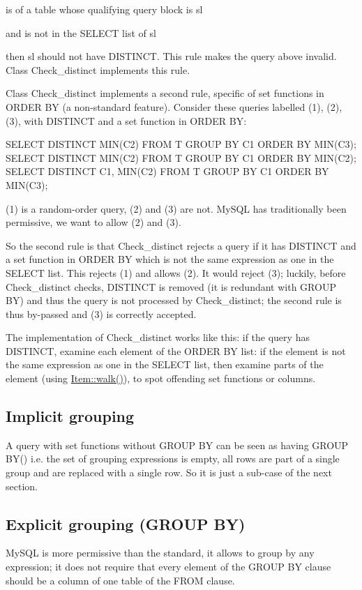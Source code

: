 \begin{DoxyItemize}
\item is of a table whose qualifying query block is \textquotesingle{}sl\textquotesingle{}
\item and is not in the S\+E\+L\+E\+CT list of \textquotesingle{}sl\textquotesingle{}
\end{DoxyItemize}

then \textquotesingle{}sl\textquotesingle{} should not have D\+I\+S\+T\+I\+N\+CT. This rule makes the query above invalid. Class Check\+\_\+distinct implements this rule.

Class Check\+\_\+distinct implements a second rule, specific of set functions in O\+R\+D\+ER BY (a non-\/standard feature). Consider these queries labelled (1), (2), (3), with D\+I\+S\+T\+I\+N\+CT and a set function in O\+R\+D\+ER BY\+: \begin{DoxyVerb}SELECT DISTINCT MIN(C2) FROM T GROUP BY C1 ORDER BY MIN(C3);
SELECT DISTINCT MIN(C2) FROM T GROUP BY C1 ORDER BY MIN(C2);
SELECT DISTINCT C1, MIN(C2) FROM T GROUP BY C1 ORDER BY MIN(C3);
\end{DoxyVerb}
 (1) is a random-\/order query, (2) and (3) are not. My\+S\+QL has traditionally been permissive, we want to allow (2) and (3).

So the second rule is that Check\+\_\+distinct rejects a query if it has D\+I\+S\+T\+I\+N\+CT and a set function in O\+R\+D\+ER BY which is not the same expression as one in the S\+E\+L\+E\+CT list. This rejects (1) and allows (2). It would reject (3); luckily, before Check\+\_\+distinct checks, D\+I\+S\+T\+I\+N\+CT is removed (it is redundant with G\+R\+O\+UP BY) and thus the query is not processed by Check\+\_\+distinct; the second rule is thus by-\/passed and (3) is correctly accepted.

The implementation of Check\+\_\+distinct works like this\+: if the query has D\+I\+S\+T\+I\+N\+CT, examine each element of the O\+R\+D\+ER BY list\+: if the element is not the same expression as one in the S\+E\+L\+E\+CT list, then examine parts of the element (using \mbox{\hyperlink{classItem_ab7d2529511c14a77e59a1b1bbabc95d7}{Item\+::walk()}}), to spot offending set functions or columns.\hypertarget{group__AGGREGATE__CHECKS_IMPLICIT_GROUPING}{}\subsection{Implicit grouping}\label{group__AGGREGATE__CHECKS_IMPLICIT_GROUPING}
A query with set functions without G\+R\+O\+UP BY can be seen as having G\+R\+O\+UP B\+Y() i.\+e. the set of grouping expressions is empty, all rows are part of a single group and are replaced with a single row. So it is just a sub-\/case of the next section.\hypertarget{group__AGGREGATE__CHECKS_EXPLICIT_GROUPING}{}\subsection{Explicit grouping (\+G\+R\+O\+U\+P B\+Y)}\label{group__AGGREGATE__CHECKS_EXPLICIT_GROUPING}
My\+S\+QL is more permissive than the standard, it allows to group by any expression; it does not require that every element of the G\+R\+O\+UP BY clause should be a column of one table of the F\+R\+OM clause.


